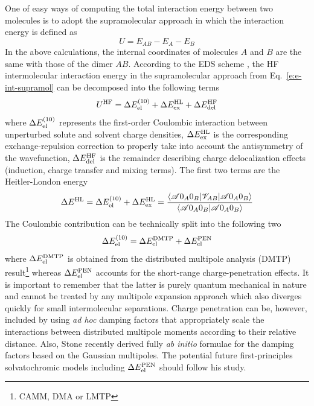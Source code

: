 \documentclass[a4paper,titlepage,twoside,fleqn,12pt]{book}
\begin{document}
\begin{refsection}
One of easy ways of computing the total interaction energy
between two molecules is to adopt the supramolecular approach
in which the interaction energy is defined as
%
\begin{equation} \label{e:e-int-supramol}
 U = E_{AB} - E_A - E_B
\end{equation}
%
In the above calculations, the internal coordinates of molecules $A$ and $B$
are the same with those of the dimer $AB$.
According to the EDS scheme \citep{Sokalski.Roszak.Pecul.CPL.1988,
Chalasinski.Szczesniak.MolPhys.1988,Cybulski.Chalasinski.Moszynski.JCP.1990,
Gora.Bartkowiak.Roszak.Leszczynski.JCP.2004}, the HF
intermolecular interaction energy in the supramolecular
approach from Eq.~\eqref{e:e-int-supramol} can be decomposed
into the following terms
%
\begin{equation}
 U^{\rm HF} = \Delta E_{\rm el}^{(10)}    + 
              \Delta E_{\rm ex}^{\rm HL}  +
              \Delta E_{\rm del}^{\rm HF}
\end{equation}
%
where $\Delta E_{\rm el}^{(10)}$ represents the first\hyp{}order 
Coulombic interaction
between unperturbed solute and solvent charge densities, 
$\Delta E_{\rm ex}^{\rm HL}$ is the corresponding exchange\hyp{}repulsion
correction to properly take into account the antisymmetry of the wavefunction,
$\Delta E_{\rm del}^{\rm HF}$ is the remainder describing charge delocalization
effects (induction, charge transfer and mixing terms). The first two terms
are the Heitler\hyp{}London energy
%
\begin{equation}
 \Delta E^{\rm HL} = \Delta E_{\rm el}^{(10)}    + 
                     \Delta E_{\rm ex}^{\rm HL}
  = \frac{
\langle \mathscr{A} 0_A0_B \lvert \mathscr{V}_{AB} \rvert \mathscr{A} 0_A0_B \rangle 
}{
\langle \mathscr{A} 0_A0_B \vert \mathscr{A} 0_A0_B \rangle 
}
\end{equation}
%
The Coulombic contribution can be technically split into the following
two
%
\begin{equation}
 \Delta E_{\rm el}^{(10)} = \Delta E_{\rm el}^{\rm DMTP} + \Delta E_{\rm el}^{\rm PEN}
\end{equation}
%
where $\Delta E_{\rm el}^{\rm DMTP}$ is obtained from the distributed multipole 
analysis (DMTP) result\footnote{CAMM, DMA or LMTP} whereas
$\Delta E_{\rm el}^{\rm PEN}$ accounts for the short\hyp{}range charge\hyp{}penetration
effects. It is important to remember that the latter is purely quantum mechanical in
nature and cannot be treated by any multipole expansion approach which also diverges
quickly for small intermolecular separations.
Charge penetration can be, however, included by using \emph{ad hoc} damping factors
that appropriately scale the interactions between distributed multipole
moments according to their relative distance.\citep{Slipchenko.Gordon.JCC.2007,Wang.Truhlar.JCTC.2010}
Also, Stone recently derived fully \emph{ab initio} formulae
for the damping factors based on the Gaussian multipoles.\citep{Stone.JPCA.2011}
The potential future
first\hyp{}principles solvatochromic
models including $\Delta E_{\rm el}^{\rm PEN}$ should follow his study.


\end{refsection}
\end{document}
